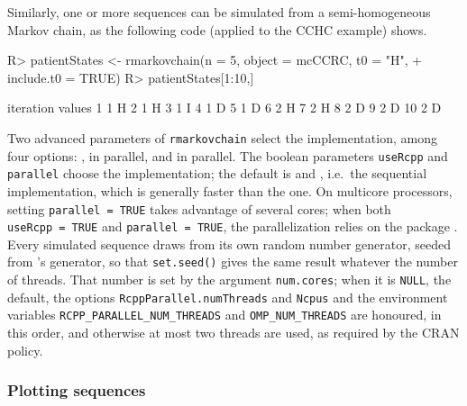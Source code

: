 \documentclass[
  nojss]{jss}
\begin{document}
Similarly, one or more sequences can be simulated from a semi-homogeneous Markov chain,
as the following code (applied to the CCHC example) shows.

\begin{CodeChunk}
\begin{CodeInput}
R> patientStates <- rmarkovchain(n = 5, object = mcCCRC, t0 = "H", 
+                               include.t0 = TRUE)
R> patientStates[1:10,]
\end{CodeInput}
\begin{CodeOutput}
   iteration values
1          1      H
2          1      H
3          1      I
4          1      D
5          1      D
6          2      H
7          2      H
8          2      D
9          2      D
10         2      D
\end{CodeOutput}
\end{CodeChunk}

Two advanced parameters of \texttt{rmarkovchain} select the implementation, among four options: ,  in parallel,  and  in parallel. The boolean parameters \texttt{useRcpp} and \texttt{parallel} choose the implementation; the default is  and , i.e.~the sequential  implementation, which is generally faster than the  one. On multicore processors, setting \texttt{parallel\ =\ TRUE} takes advantage of several cores; when both \texttt{useRcpp\ =\ TRUE} and \texttt{parallel\ =\ TRUE}, the parallelization relies on the  package \citep{pkg:RcppParallel}. Every simulated sequence draws from its own random number generator, seeded from 's generator, so that \texttt{set.seed()} gives the same result whatever the number of threads. That number is set by the argument \texttt{num.cores}; when it is \texttt{NULL}, the default, the options \texttt{RcppParallel.numThreads} and \texttt{Ncpus} and the environment variables \texttt{RCPP\_PARALLEL\_NUM\_THREADS} and \texttt{OMP\_NUM\_THREADS} are honoured, in this order, and otherwise at most two threads are used, as required by the CRAN policy.

\subsubsection{Plotting sequences}\label{plotting-sequences}
\end{document}
